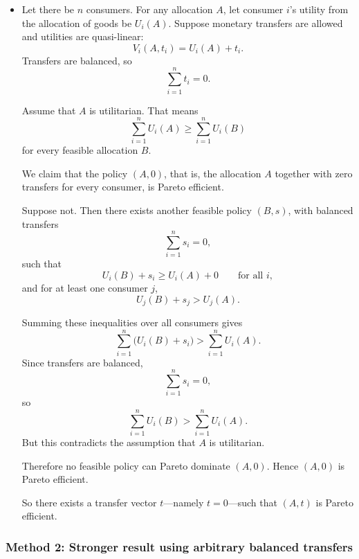 \documentclass[12pt]{article}
\begin{document}
\begin{itemize}
    \item Let there be \(n\) consumers. For any allocation \(A\), let consumer \(i\)'s utility from the allocation of goods be \(U_i(A)\). Suppose monetary transfers are allowed and utilities are quasi-linear:
    \[
    V_i(A,t_i)=U_i(A)+t_i.
    \]
    Transfers are balanced, so
    \[
    \sum_{i=1}^n t_i=0.
    \]

    Assume that \(A\) is utilitarian. That means
    \[
    \sum_{i=1}^n U_i(A)\ge \sum_{i=1}^n U_i(B)
    \]
    for every feasible allocation \(B\).

    We claim that the policy \((A,0)\), that is, the allocation \(A\) together with zero transfers for every consumer, is Pareto efficient.

    Suppose not. Then there exists another feasible policy \((B,s)\), with balanced transfers
    \[
    \sum_{i=1}^n s_i=0,
    \]
    such that
    \[
    U_i(B)+s_i\ge U_i(A)+0
    \qquad\text{for all }i,
    \]
    and for at least one consumer \(j\),
    \[
    U_j(B)+s_j>U_j(A).
    \]

    Summing these inequalities over all consumers gives
    \[
    \sum_{i=1}^n \bigl(U_i(B)+s_i\bigr)
    >
    \sum_{i=1}^n U_i(A).
    \]
    Since transfers are balanced,
    \[
    \sum_{i=1}^n s_i=0,
    \]
    so
    \[
    \sum_{i=1}^n U_i(B)
    >
    \sum_{i=1}^n U_i(A).
    \]
    But this contradicts the assumption that \(A\) is utilitarian.

    Therefore no feasible policy can Pareto dominate \((A,0)\). Hence \((A,0)\) is Pareto efficient.

    So there exists a transfer vector \(t\)---namely \(t=0\)---such that \((A,t)\) is Pareto efficient.
\end{itemize}

\newpage
\subsubsection{Method 2: Stronger result using arbitrary balanced transfers}
\end{document}
